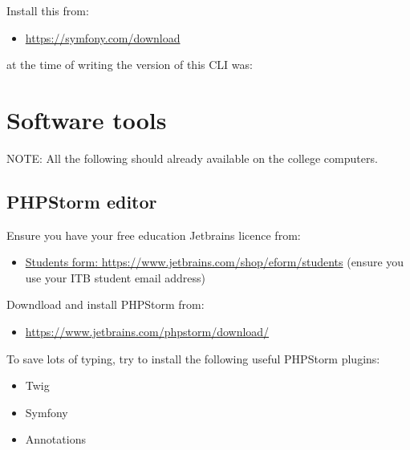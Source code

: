 \documentclass[a4paperpaper,openright]{book}
\newenvironment{Shaded}{}{}
\newcommand{\ExtensionTok}[1]{#1}
\newcommand{\NormalTok}[1]{#1}
\providecommand{\tightlist}{%
  \setlength{\itemsep}{0pt}\setlength{\parskip}{0pt}}
\begin{document}
Install this from:

\begin{itemize}
\tightlist
\item
  \url{https://symfony.com/download}
\end{itemize}

at the time of writing the version of this CLI was:

\begin{Shaded}
\end{Shaded}

\hypertarget{software-tools-1}{%
\chapter{\texorpdfstring{Software
tools\label{appendix_software_setup}}{Software tools}}\label{software-tools-1}}

NOTE: All the following should already available on the college
computers.

\hypertarget{phpstorm-editor}{%
\section{PHPStorm editor}\label{phpstorm-editor}}

Ensure you have your free education Jetbrains licence from:

\begin{itemize}
\tightlist
\item
  \href{https://www.jetbrains.com/shop/eform/students}{Students form:
  https://www.jetbrains.com/shop/eform/students} (ensure you use your
  ITB student email address)
\end{itemize}

Downdload and install PHPStorm from:

\begin{itemize}
\tightlist
\item
  \url{https://www.jetbrains.com/phpstorm/download/}
\end{itemize}

To save lots of typing, try to install the following useful PHPStorm
plugins:

\begin{itemize}
\tightlist
\item
  Twig
\item
  Symfony
\item
  Annotations
\end{itemize}
\end{document}

